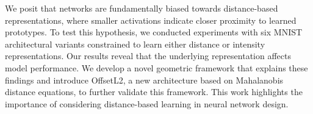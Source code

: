 We posit that networks are fundamentally biased towards distance-based representations, where smaller activations indicate closer proximity to learned prototypes. To test this hypothesis, we conducted experiments with six MNIST architectural variants constrained to learn either distance or intensity representations. Our results reveal that the underlying representation affects model performance. We develop a novel geometric framework that explains these findings and introduce OffsetL2, a new architecture based on Mahalanobis distance equations, to further validate this framework. This work highlights the importance of considering distance-based learning in neural network design.
